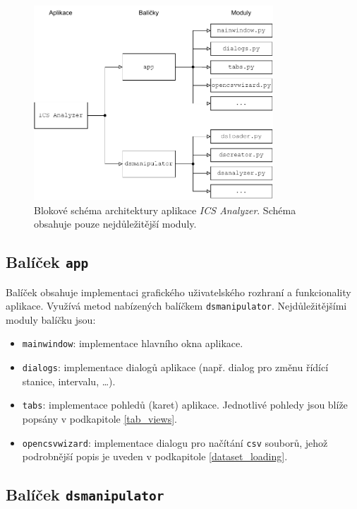 \begin{figure}[H]
	\centering
	\includegraphics[width=0.8\textwidth]{obrazky-figures/architecture.pdf}
	\caption{Blokové schéma architektury aplikace \emph{ICS Analyzer}. Schéma obsahuje pouze nejdůležitější moduly.}
	\label{fig:app_arch}
\end{figure}




\subsection*{Balíček \texttt{app}}
\label{app}

Balíček obsahuje implementaci grafického uživatelského rozhraní a funkcionality aplikace. Využívá metod nabízených balíčkem \texttt{dsmanipulator}. Nejdůležitějšími moduly balíčku jsou:

\begin{itemize}
    \item \texttt{mainwindow}: implementace hlavního okna aplikace.
    \item \texttt{dialogs}: implementace dialogů aplikace (např. dialog pro změnu řídící stanice, intervalu, \dots).
    \item \texttt{tabs}: implementace pohledů (karet) aplikace. Jednotlivé pohledy jsou blíže popsány v podkapitole \ref{tab_views}.
    \item \texttt{opencsvwizard}: implementace dialogu pro načítání \texttt{csv} souborů, jehož podrobnější popis je uveden v podkapitole \ref{dataset_loading}.
\end{itemize}



\subsection*{Balíček \texttt{dsmanipulator}}
\label{dsmanipulator}

